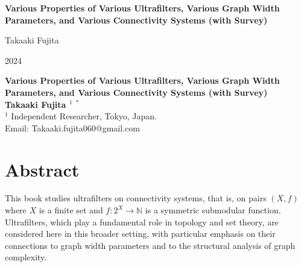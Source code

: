 \documentclass[10pt]{book}
\theoremstyle{definition}
\begin{document}
\begin{titlepage}
\thispagestyle{empty}


\vspace*{2.8cm}

\hspace*{3.8cm}
\begin{minipage}{0.68\textwidth}
    {\Huge\bfseries Various Properties of Various Ultrafilters, Various Graph Width Parameters, and Various Connectivity Systems (with Survey)\par}
    \vspace{0.6cm}

    \vspace{2cm}
    {\Large Takaaki Fujita\par}

    \vfill

    {\large 2024\par}
\end{minipage}

\end{titlepage}


\begin{center}
\textbf{\Large Various Properties of Various Ultrafilters, Various Graph Width Parameters, and Various Connectivity Systems (with Survey)}\\ \vspace{10pt}
\textbf{Takaaki Fujita $^{1}$ $^*$} \\ 
	$^1$ Independent Researcher, Tokyo, Japan.\\	
    Email: Takaaki.fujita060@gmail.com \\
\end{center}

\section*{Abstract}
This book studies ultrafilters on connectivity systems, that is, on pairs \((X,f)\) where \(X\) is a finite set and \(f:2^{X}\to \mathbb{N}\) is a symmetric submodular function. Ultrafilters, which play a fundamental role in topology and set theory, are considered here in this broader setting, with particular emphasis on their connections to graph width parameters and to the structural analysis of graph complexity.
\end{document}
